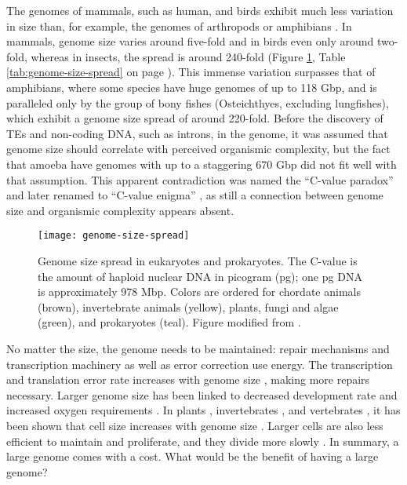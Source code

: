 The genomes of mammals, such as human, and birds exhibit much less
variation in size than, for example, the genomes of arthropods or
amphibians \citep{Gregory2005}.  In mammals, genome size varies around
five-fold and in birds even only around two-fold, whereas in insects,
the spread is around 240-fold (Figure \ref{fig:genome-size-spread},
Table \ref{tab:genome-size-spread} on page
\pageref{tab:genome-size-spread}).  This immense variation surpasses that
of amphibians, where some species have huge genomes of up to 118 Gbp,
and is paralleled only by the group of bony fishes (Osteichthyes,
excluding lungfishes), which exhibit a genome size spread of around
220-fold.  Before the discovery of TEs and non-coding DNA, such as
introns, in the genome, it was assumed that genome size should correlate
with perceived organismic complexity, but the fact that amoeba have
genomes with up to a staggering 670 Gbp \citep{Parfrey2008} did not fit
well with that assumption.  This apparent contradiction was named the
``C-value paradox'' and later renamed to ``C-value enigma''
\citep{Gregory2007}, as still a connection between genome size and
organismic complexity appears absent.

\begin{figure}
\centering
\texttt{[image: genome-size-spread]}
\caption[Genome size spread in eukaryotes and prokaryotes]{Genome size
spread in eukaryotes and prokaryotes.  The C-value is the amount of
haploid nuclear DNA in picogram (pg); one pg DNA is approximately 978
Mbp.  Colors are ordered for chordate animals (brown), invertebrate animals (yellow),
plants, fungi and algae (green), and prokaryotes (teal).  Figure modified from
\citet{Gregory2004}.}
\label{fig:genome-size-spread}
\end{figure}

No matter the size, the genome needs to be maintained: repair mechanisms
and transcription machinery as well as error correction use energy.  The
transcription and translation error rate increases with genome size
\citep{Zaher2009}, making more repairs necessary.  Larger genome size has
been linked to decreased development rate \citep{White2000} and
increased oxygen requirements \citep{Vinogradov1997, Gregory2002}.  In
plants \citep{Grime1983}, invertebrates \citep{Gregory2005}, and
vertebrates \citep{Horner1983, Olmo1982, Gregory2000}, it has been shown
that cell size increases with genome size \citep{Dufresne2011}.  Larger
cells are also less efficient to maintain and proliferate, and they
divide more slowly \citep{Bennett1977}.  In summary, a large genome comes
with a cost.  What would be the benefit of having a large genome?

